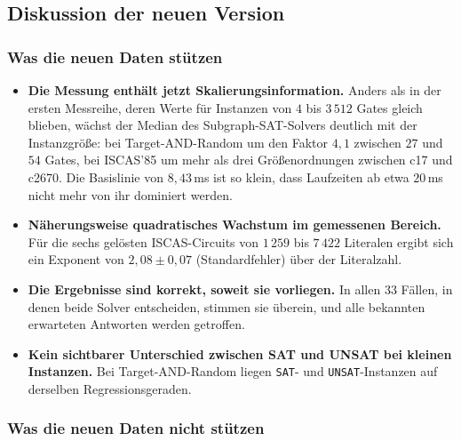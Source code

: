 \documentclass[a4paper,12pt]{article}
\theoremstyle{definition}
\begin{document}
\subsection{Diskussion der neuen Version}
\label{sec:v2-diskussion}

\subsubsection{Was die neuen Daten stützen}

\begin{itemize}
	\item \textbf{Die Messung enthält jetzt Skalierungsinformation.} Anders als in der ersten Messreihe, deren Werte für Instanzen von $4$ bis $3\,512$ Gates gleich blieben, wächst der Median des Subgraph-SAT-Solvers deutlich mit der Instanzgröße: bei Target-AND-Random um den Faktor $4{,}1$ zwischen $27$ und $54$ Gates, bei ISCAS'85 um mehr als drei Größenordnungen zwischen c17 und c2670. Die Basislinie von $8{,}43$\,ms ist so klein, dass Laufzeiten ab etwa $20$\,ms nicht mehr von ihr dominiert werden.
	\item \textbf{Näherungsweise quadratisches Wachstum im gemessenen Bereich.} Für die sechs gelösten ISCAS-Circuits von $1\,259$ bis $7\,422$ Literalen ergibt sich ein Exponent von $2{,}08 \pm 0{,}07$ (Standardfehler) über der Literalzahl.
	\item \textbf{Die Ergebnisse sind korrekt, soweit sie vorliegen.} In allen $33$ Fällen, in denen beide Solver entscheiden, stimmen sie überein, und alle bekannten erwarteten Antworten werden getroffen.
	\item \textbf{Kein sichtbarer Unterschied zwischen SAT und UNSAT bei kleinen Instanzen.} Bei Target-AND-Random liegen \texttt{SAT}- und \texttt{UNSAT}-Instanzen auf derselben Regressionsgeraden.
\end{itemize}

\subsubsection{Was die neuen Daten nicht stützen}
\end{document}
